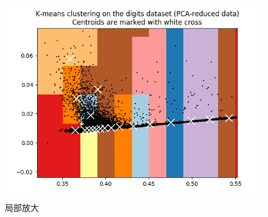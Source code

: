\documentclass[12pt]{article}
\begin{document}
\begin{figure}[htbp]
\centering
\includegraphics[width=1.0\textwidth]{../kmeans_3.png}
\caption{局部放大}
\label{fig:K-means_3}
\end{figure}
\end{document}
